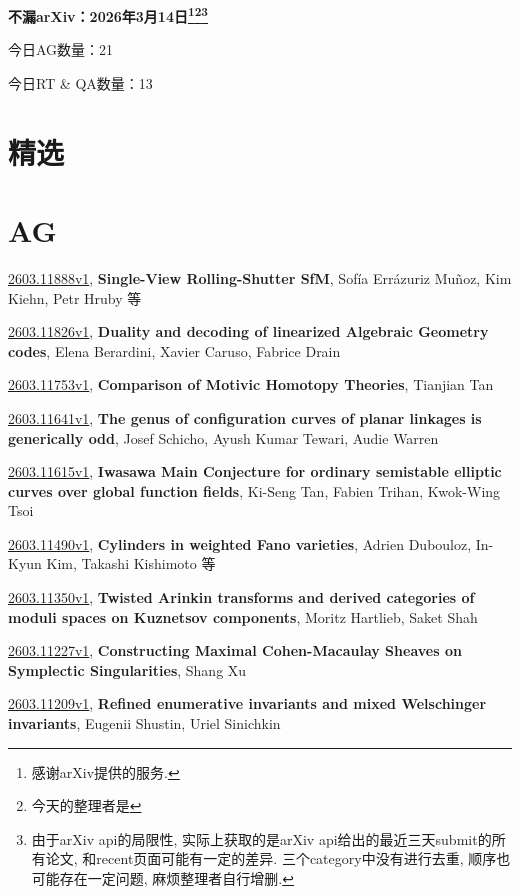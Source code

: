 \documentclass[9pt, a4paper]{article}
\theoremstyle{plain}
\theoremstyle{definition}
\theoremstyle{remark}
\newcommand{\arxiv}[3]{\href{https://arxiv.org/abs/#1}{#1}, \textbf{\textcolor{arxivblue}{#2}}, #3}
\newcommand{\AGnumber}{21}
\newcommand{\RTQAnumber}{13}
\newcommand{\NewestDate}{2026年3月14日}
\newcommand{\todayarXiver}{} %
\begin{document}
\begin{center}
    \Huge\textbf{不漏arXiv：\NewestDate\footnote{感谢arXiv提供的服务.}\footnote{今天的整理者是\todayarXiver}\footnote{由于arXiv api的局限性, 实际上获取的是arXiv api给出的最近三天submit的所有论文, 和recent页面可能有一定的差异. 三个category中没有进行去重, 顺序也可能存在一定问题, 麻烦整理者自行增删.}} \\
\end{center}

\setcounter{section}{-1}

\begin{center}
    今日AG数量：\AGnumber
    
    今日RT \& QA数量：\RTQAnumber
    
\end{center}


\section{精选}


\section{AG}
\arxiv{2603.11888v1}{Single-View Rolling-Shutter SfM}{Sofía Errázuriz Muñoz, Kim Kiehn, Petr Hruby 等}

\arxiv{2603.11826v1}{Duality and decoding of linearized Algebraic Geometry codes}{Elena Berardini, Xavier Caruso, Fabrice Drain}

\arxiv{2603.11753v1}{Comparison of Motivic Homotopy Theories}{Tianjian Tan}

\arxiv{2603.11641v1}{The genus of configuration curves of planar linkages is generically odd}{Josef Schicho, Ayush Kumar Tewari, Audie Warren}

\arxiv{2603.11615v1}{Iwasawa Main Conjecture for ordinary semistable elliptic curves over global function fields}{Ki-Seng Tan, Fabien Trihan, Kwok-Wing Tsoi}

\arxiv{2603.11490v1}{Cylinders in weighted Fano varieties}{Adrien Dubouloz, In-Kyun Kim, Takashi Kishimoto 等}

\arxiv{2603.11350v1}{Twisted Arinkin transforms and derived categories of moduli spaces on Kuznetsov components}{Moritz Hartlieb, Saket Shah}

\arxiv{2603.11227v1}{Constructing Maximal Cohen-Macaulay Sheaves on Symplectic Singularities}{Shang Xu}

\arxiv{2603.11209v1}{Refined enumerative invariants and mixed Welschinger invariants}{Eugenii Shustin, Uriel Sinichkin}
\end{document}
